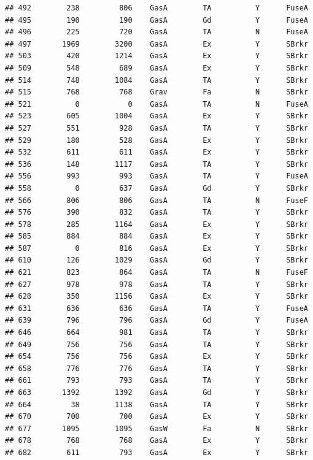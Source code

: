 \documentclass[]{article}
\begin{document}
\begin{verbatim}
## 492        238         806    GasA        TA          Y      FuseA
## 495        190         190    GasA        Gd          Y      FuseA
## 496        225         720    GasA        TA          N      FuseA
## 497       1969        3200    GasA        Ex          Y      SBrkr
## 503        420        1214    GasA        Ex          Y      SBrkr
## 509        548         689    GasA        Ex          Y      SBrkr
## 514        748        1084    GasA        TA          Y      SBrkr
## 515        768         768    Grav        Fa          N      SBrkr
## 521          0           0    GasA        TA          N      FuseA
## 523        605        1004    GasA        Ex          Y      SBrkr
## 527        551         928    GasA        TA          Y      SBrkr
## 529        180         528    GasA        Ex          Y      SBrkr
## 532        611         611    GasA        Ex          Y      SBrkr
## 536        148        1117    GasA        TA          Y      SBrkr
## 556        993         993    GasA        TA          Y      FuseA
## 558          0         637    GasA        Gd          Y      SBrkr
## 566        806         806    GasA        TA          N      FuseF
## 576        390         832    GasA        TA          Y      SBrkr
## 578        285        1164    GasA        Ex          Y      SBrkr
## 585        884         884    GasA        Ex          Y      SBrkr
## 587          0         816    GasA        Ex          Y      SBrkr
## 610        126        1029    GasA        Gd          Y      SBrkr
## 621        823         864    GasA        TA          N      FuseF
## 627        978         978    GasA        TA          Y      SBrkr
## 628        350        1156    GasA        Ex          Y      SBrkr
## 631        636         636    GasA        TA          Y      FuseA
## 639        796         796    GasA        Gd          Y      FuseA
## 646        664         981    GasA        TA          Y      SBrkr
## 649        756         756    GasA        TA          Y      SBrkr
## 654        756         756    GasA        Ex          Y      SBrkr
## 658        776         776    GasA        TA          Y      SBrkr
## 661        793         793    GasA        TA          Y      SBrkr
## 663       1392        1392    GasA        Gd          Y      SBrkr
## 664         38        1138    GasA        TA          Y      SBrkr
## 670        700         700    GasA        Ex          Y      SBrkr
## 677       1095        1095    GasW        Fa          N      SBrkr
## 678        768         768    GasA        Ex          Y      SBrkr
## 682        611         793    GasA        Ex          Y      SBrkr

\end{verbatim}
\end{document}
